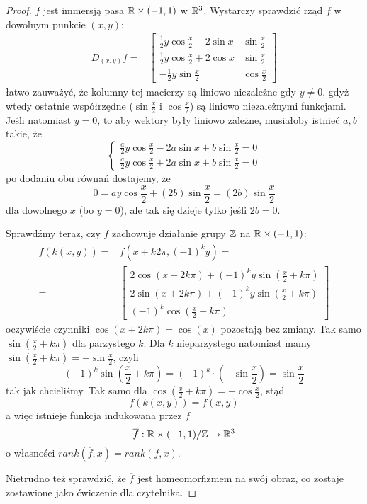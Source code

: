 \begin{example}
\begin{proof}
      $f$ jest immersją pasa $\mathbb{R}\times(-1,1)$ w $\mathbb{R}^3$. Wystarczy sprawdzić rząd $f$ w dowolnym punkcie $(x,y)$:
      \begin{align*}
        D_{(x,y)}f=&
        \begin{bmatrix} 
          \frac{1}{2}y\cos\frac{x}{2}-2\sin x & \sin\frac{x}{2}\\
          \frac{1}{2}y\cos\frac{x}{2}+2\cos x & \sin\frac{x}{2}\\
          -\frac{1}{2}y\sin\frac{x}{2} & \cos\frac{x}{2}
        \end{bmatrix}
      \end{align*}
      łatwo zauważyć, że kolumny tej macierzy są liniowo niezależne gdy $y\neq 0$, gdyż wtedy ostatnie współrzędne ($\sin\frac{x}{2}$ i $\cos\frac{x}{2}$) są liniowo niezależnymi funkcjami. Jeśli natomiast $y= 0$, to aby wektory były liniowo zależne, musiałoby istnieć $a,b$ takie, że
      $$\begin{cases}\frac{a}{2}y\cos\frac{x}{2}-2a\sin x+b\sin\frac{x}{2}=0\\
      \frac{a}{2}y\cos\frac{x}{2}+2a\sin x+b\sin\frac{x}{2}=0\end{cases}$$
      po dodaniu obu równań dostajemy, że
      $$0=ay\cos\frac{x}{2}+(2b)\sin\frac{x}{2}=(2b)\sin\frac{x}{2}$$
      dla dowolnego $x$ (bo $y=0$), ale tak się dzieje tylko jeśli $2b=0$.

      Sprawdźmy teraz, czy $f$ zachowuje działanie grupy $\mathbb{Z}$ na $\mathbb{R}\times(-1,1)$:
      \begin{align*}
        f(k(x,y))=&f(x+k2\pi,(-1)^ky)=\\
        =&\begin{bmatrix}
          2\cos(x+2k\pi)+(-1)^ky\sin(\frac{x}{2}+k\pi)\\
          2\sin(x+2k\pi)+(-1)^ky\sin(\frac{x}{2}+k\pi)\\
          (-1)^k\cos(\frac{x}{2}+k\pi)
        \end{bmatrix}
      \end{align*}
      oczywiście czynniki $\cos(x+2k\pi)=\cos(x)$ pozostają bez zmiany. Tak samo $\sin(\frac{x}{2}+k\pi)$ dla parzystego $k$. Dla $k$ nieparzystego natomiast mamy $\sin(\frac{x}{2}+k\pi)=-\sin\frac{x}{2}$, czyli 
      $$(-1)^k\sin(\frac{x}{2}+k\pi)=(-1)^k\cdot(-\sin\frac{x}{2})=\sin\frac{x}{2}$$
      tak jak chcieliśmy. Tak samo dla $\cos(\frac{x}{2}+k\pi)=-\cos\frac{x}{2}$, stąd
      $$f(k(x,y))=f(x,y)$$
      a więc istnieje funkcja indukowana przez $f$
      $$\overline{f}:\mathbb{R}\times(-1,1)/\mathbb{Z}\to\mathbb{R}^3$$
      o własności $rank(\overline{f},x)=rank(f,x)$.

      Nietrudno też sprawdzić, że $\overline{f}$ jest homeomorfizmem na swój obraz, co zostaje zostawione jako ćwiczenie dla czytelnika.
    \end{proof}
\end{example}
